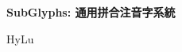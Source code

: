 \documentclass[12pt]{article}
\begin{document}
\begin{center}
    {\Huge \textbf{SubGlyphs: 通用拼合注音字系統} \par}
    {\Large HyLu \par}
    \hrulefill
\end{center}






\end{document}
